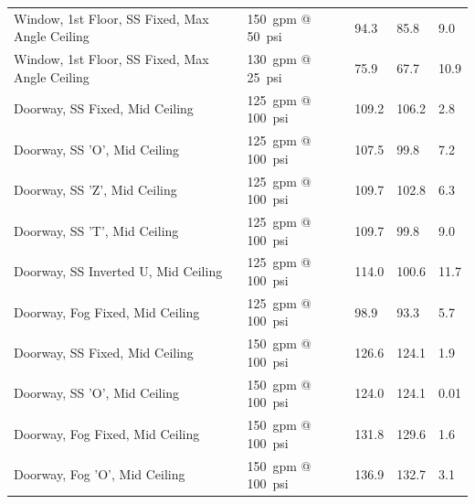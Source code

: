 \documentclass[12pt,oneside]{book}
\begin{document}
\begin{table}[!ht]
\begin{tabular}{lllll}
Window, 1st Floor, SS Fixed, Max Angle Ceiling           & 150~gpm @ 50~psi               &  94.3                             & 85.8                               & 9.0                    \\
Window, 1st Floor, SS Fixed, Max Angle Ceiling           & 130~gpm @ 25~psi               &  75.9                             & 67.7                               & 10.9                   \\
Doorway, SS Fixed, Mid Ceiling                   		 & 125~gpm @ 100~psi              & 109.2                             & 106.2                              & 2.8                    \\
Doorway, SS 'O', Mid Ceiling                     		 & 125~gpm @ 100~psi              & 107.5                             & 99.8                               & 7.2                    \\
Doorway, SS 'Z', Mid Ceiling                     		 & 125~gpm @ 100~psi              & 109.7                             & 102.8                              & 6.3                    \\
Doorway, SS 'T', Mid Ceiling                     		 & 125~gpm @ 100~psi              & 109.7                             & 99.8                               & 9.0                    \\
Doorway, SS Inverted U, Mid Ceiling              		 & 125~gpm @ 100~psi              & 114.0                             & 100.6                              & 11.7                   \\
Doorway, Fog Fixed, Mid Ceiling                  		 & 125~gpm @ 100~psi              &  98.9                             & 93.3                               & 5.7                    \\
Doorway, SS Fixed, Mid Ceiling                   		 & 150~gpm @ 100~psi              & 126.6                             & 124.1                              & 1.9                    \\
Doorway, SS 'O', Mid Ceiling                     		 & 150~gpm @ 100~psi              & 124.0                             & 124.1                              & 0.01                   \\
Doorway, Fog Fixed, Mid Ceiling                  		 & 150~gpm @ 100~psi              & 131.8                             & 129.6                              & 1.6                    \\
Doorway, Fog 'O', Mid Ceiling                    		 & 150~gpm @ 100~psi              & 136.9                             & 132.7                              & 3.1                    \\

\end{tabular}
\end{table}
\end{document}
